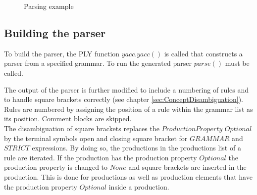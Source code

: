 \begin{figure}[H]
\caption{Parsing example}
\label{fig:ImplementationParsing}
\end{figure}
                
\subsection{Building the parser}\label{sec:ImplementationRunParser}

To build the parser, the \ac{PLY} function $yacc.yacc()$ is called that constructs a parser from a specified grammar. To run the generated parser $parse()$ must be called. 

The output of the parser is further modified to include a numbering of rules and to handle square brackets correctly (see chapter \ref{sec:ConceptDisambiguation}).
Rules are numbered by assigning the position of a rule within the grammar list as its position. Comment blocks are skipped. \\
The disambiguation of square brackets replaces the $ProductionProperty$ $Optional$ by the terminal symbols open and closing square bracket for $GRAMMAR$ and $STRICT$ expressions.
By doing so, the productions in the productions list of a rule are iterated. If the production has the production property $Optional$ the production property is changed to $None$ and square brackets are inserted in the production. This is done for productions as well as production elements that have the production property $Optional$ inside a production.


